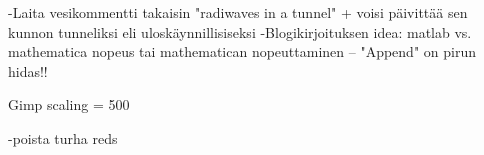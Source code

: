 -Laita vesikommentti takaisin "radiwaves in a tunnel" + voisi päivittää sen kunnon tunneliksi eli uloskäynnillisiseksi
-Blogikirjoituksen idea: matlab vs. mathematica nopeus tai mathematican nopeuttaminen – "Append" on pirun hidas!!

Gimp scaling = 500 


-poista turha reds
